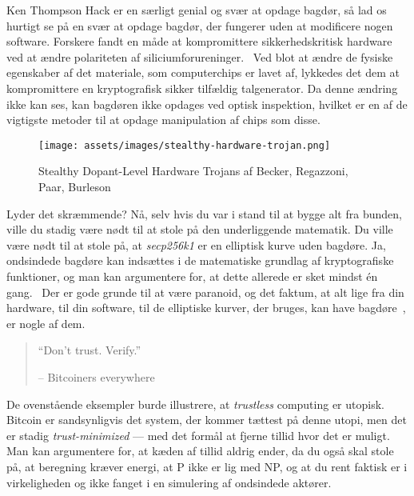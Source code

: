 Ken Thompson Hack er en særligt genial og svær at opdage bagdør,
så lad os hurtigt se på en svær at opdage bagdør, der fungerer uden at
modificere nogen software. Forskere fandt en måde at kompromittere 
sikkerhedskritisk hardware ved at ændre polariteten af 
siliciumforureninger.~\cite{becker2013stealthy} Ved blot at ændre de fysiske 
egenskaber af det materiale, som computerchips er lavet af, lykkedes det dem 
at kompromittere en kryptografisk sikker tilfældig talgenerator. Da denne
ændring ikke kan ses, kan bagdøren ikke opdages ved optisk inspektion, 
hvilket er en af de vigtigste metoder til at opdage manipulation af chips 
som disse.

\begin{figure}[htbp]
  \centering
  \texttt{[image: assets/images/stealthy-hardware-trojan.png]}
  \caption{Stealthy Dopant-Level Hardware Trojans af Becker, Regazzoni, Paar, 
  Burleson}
  \label{fig:stealthy-hardware-trojan}
\end{figure}

Lyder det skræmmende? Nå, selv hvis du var i stand til at bygge alt fra
bunden, ville du stadig være nødt til at stole på den underliggende matematik. 
Du ville være nødt til at stole på, at \textit{secp256k1} er en elliptisk kurve 
uden bagdøre. Ja, ondsindede bagdøre kan indsættes i de matematiske
grundlag af kryptografiske funktioner, og man kan argumentere for, at dette 
allerede er sket mindst én gang.~\cite{wiki:Dual_EC_DRBG} Der er gode grunde 
til at være paranoid, og det faktum, at alt lige fra din hardware, til din 
software, til de elliptiske kurver, der bruges, kan have 
bagdøre~\cite{wiki:backdoors}, er nogle af dem.

\begin{quotation}\begin{samepage}
  \enquote{Don't trust. Verify.}
  \begin{flushright} -- Bitcoiners everywhere
\end{flushright}\end{samepage}\end{quotation}

De ovenstående eksempler burde illustrere, at \textit{trustless} computing er
utopisk. Bitcoin er sandsynligvis det system, der kommer tættest på denne
utopi, men det er stadig \textit{trust-minimized} --- med det formål at fjerne 
tillid hvor det er muligt. Man kan argumentere for, at kæden af tillid aldrig 
ender, da du også skal stole på, at beregning kræver energi, at P ikke er 
lig med NP, og at du rent faktisk er i virkeligheden og ikke
fanget i en simulering af ondsindede aktører.

